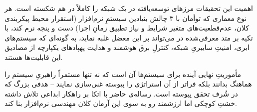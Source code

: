 \documentclass[oneside,openany,phd]{TMU-Thesis}
\begin{document}
اهمیت این تحقیقات مرزهای توسعه‌یافته در یک شبکه  را کاملاً در هم شکسته است. هر نوع معماری که توأمان با ۳ چالش بنیادین سیستمِ نرم‌افزار (استقرار محیط پیکربندی کلان، عدم‌قطعیت‌های متغیر شرایط و نیاز تطبیق زمانِ اجرا) دست و پنجه نرم کند، با تکیه بر متد معرفی‌شده در  می‌تواند بر این معضل غلبه نماید، به گونه‌ای که سیستم‌های ابری، امنیتِ سایبریِ شبکه‌، کنترلِ برق هوشمند و هدایت پهپادهای یکپارچه از مصادیق این قابلیت‌ها هستند.

مأموریتِ نهایی آینده برای سیستم‌ها آن است که نه تنها مستمراً راهبریِ سیستم را هماهنگ بدانند بلکه فراتر از آن استراتژی را پیوسته غنی‌سازی نمایند – هدفی بزرگ که در شُرف تحقق پیوسته است. رساله‌ی حاضر با اتکا بر راهکار ابداعی  تلاش داشته خشتِ کوچکی اما ارزشمند رو به سوی این آرمان کلان مهندسی نرم‌افزار بنا کند.
\newpage




\ifstandalone


\fi
\end{document}

